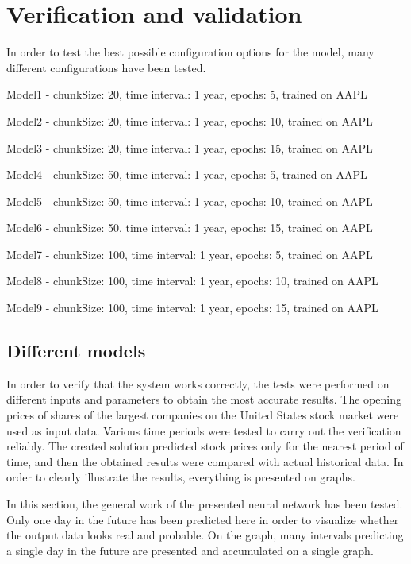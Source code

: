 \chapter{Verification and validation}

In order to test the best possible configuration options for the model, many different configurations have been tested.

\par
\bigskip
Model1 - chunkSize: 20, time interval: 1 year, epochs: 5, trained on AAPL\par
Model2 - chunkSize: 20, time interval: 1 year, epochs: 10, trained on AAPL\par
Model3 - chunkSize: 20, time interval: 1 year, epochs: 15, trained on AAPL\par
\par
\bigskip
Model4 - chunkSize: 50, time interval: 1 year, epochs: 5, trained on AAPL\par
Model5 - chunkSize: 50, time interval: 1 year, epochs: 10, trained on AAPL\par
Model6 - chunkSize: 50, time interval: 1 year, epochs: 15, trained on AAPL\par
\par
\bigskip
Model7 - chunkSize: 100, time interval: 1 year, epochs: 5, trained on AAPL\par
Model8 - chunkSize: 100, time interval: 1 year, epochs: 10, trained on AAPL\par
Model9 - chunkSize: 100, time interval: 1 year, epochs: 15, trained on AAPL\par
\par
\bigskip

\section{Different models}

In order to verify that the system works correctly, the tests were performed on different inputs and parameters to obtain the most accurate results. The opening prices of shares of the largest companies on the United States stock market were used as input data. Various time periods were tested to carry out the verification reliably. The created solution predicted stock prices only for the nearest period of time, and then the obtained results were compared with actual historical data. In order to clearly illustrate the results, everything is presented on graphs.

In this section, the general work of the presented neural network has been tested. Only one day in the future has been predicted here in order to visualize whether the output data looks real and probable. On the graph, many intervals predicting a single day in the future are presented and accumulated on a single graph.

